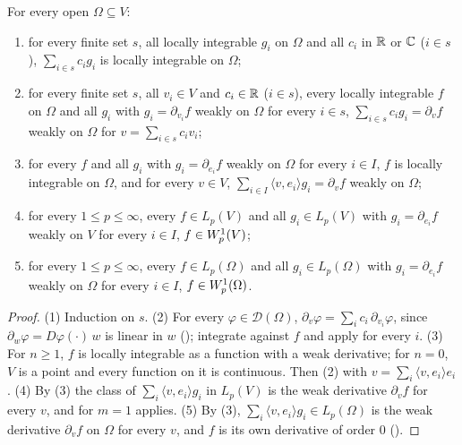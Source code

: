 \begin{lemma}
\label{lem:weak-derivative-direction-linear}
\leanok
{}
For every open $\Omega \subseteq V$:
\begin{enumerate}
  \item for every finite set $s$, all locally integrable $g_i$ on $\Omega$ and all $c_i$ in $\mathbb{R}$
    or $\mathbb{C}$ ($i \in s$), $\sum_{i \in s} c_i g_i$ is locally integrable on $\Omega$;
  \item for every finite set $s$, all $v_i \in V$ and $c_i \in \mathbb{R}$ ($i \in s$), every locally
    integrable $f$ on $\Omega$ and all $g_i$ with $g_i = \partial_{v_i} f$ weakly on $\Omega$ for
    every $i \in s$, $\sum_{i \in s} c_i g_i = \partial_v f$ weakly on $\Omega$ for
    $v = \sum_{i \in s} c_i v_i$;
  \item for every $f$ and all $g_i$ with $g_i = \partial_{e_i} f$ weakly on $\Omega$ for every
    $i \in I$, $f$ is locally integrable on $\Omega$, and for every $v \in V$,
    $\sum_{i \in I} \langle v, e_i \rangle g_i = \partial_v f$ weakly on $\Omega$;
  \item for every $1 \leq p \leq \infty$, every $f \in L_p(V)$ and all $g_i \in L_p(V)$ with
    $g_i = \partial_{e_i} f$ weakly on $V$ for every $i \in I$, $f \in W^{1}_{p}(V)$;
  \item for every $1 \leq p \leq \infty$, every $f \in L_p(\Omega)$ and all $g_i \in L_p(\Omega)$
    with $g_i = \partial_{e_i} f$ weakly on $\Omega$ for every $i \in I$,
    $f \in W^{1}_{p}(\Omega)$.
\end{enumerate}
\end{lemma}

\begin{proof}
\leanok
(1) Induction on $s$. (2) For every $\varphi \in \mathcal D(\Omega)$,
$\partial_v \varphi = \sum_i c_i \, \partial_{v_i} \varphi$, since
$\partial_w \varphi = D\varphi(\cdot) \, w$ is linear in $w$
(); integrate against $f$ and apply
 for every $i$. (3) For $n \geq 1$, $f$ is locally integrable
as a function with a weak derivative; for $n = 0$, $V$ is a point and every function on it is
continuous. Then (2) with $v = \sum_i \langle v, e_i \rangle e_i$. (4) By (3) the class of
$\sum_i \langle v, e_i \rangle g_i$ in $L_p(V)$ is the weak derivative $\partial_v f$ for every
$v$, and  for $m = 1$ applies. (5) By (3),
$\sum_i \langle v, e_i \rangle g_i \in L_p(\Omega)$ is the weak derivative $\partial_v f$ on
$\Omega$ for every $v$, and $f$ is its own derivative of order $0$
().
\end{proof}


